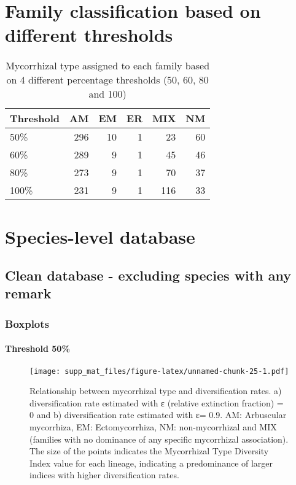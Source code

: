 \documentclass[]{article}
\let\oldparagraph\paragraph
\renewcommand{\paragraph}[1]{\oldparagraph{#1}\mbox{}}
\begin{document}
\hypertarget{family-classification-based-on-different-thresholds}{%
\section{Family classification based on different
thresholds}\label{family-classification-based-on-different-thresholds}}

\begin{longtable}{l|r|r|r|r|r}
\caption{\label{tab:unnamed-chunk-23}Mycorrhizal type assigned to each family based on 4 different percentage thresholds (50, 60, 80 and 100)}\\
\hline
Threshold & AM & EM & ER & MIX & NM\\
\hline
50\% & 296 & 10 & 1 & 23 & 60\\
\hline
60\% & 289 & 9 & 1 & 45 & 46\\
\hline
80\% & 273 & 9 & 1 & 70 & 37\\
\hline
100\% & 231 & 9 & 1 & 116 & 33\\
\hline
\end{longtable}

\hypertarget{species-level-database}{%
\section{Species-level database}\label{species-level-database}}

\hypertarget{clean-database---excluding-species-with-any-remark}{%
\subsection{Clean database - excluding species with any
remark}\label{clean-database---excluding-species-with-any-remark}}

\hypertarget{boxplots-2}{%
\subsubsection{Boxplots}\label{boxplots-2}}

\hypertarget{threshold-50-2}{%
\paragraph{Threshold 50\%}\label{threshold-50-2}}

\begin{figure}
\centering
\texttt{[image: supp\_mat\_files/figure-latex/unnamed-chunk-25-1.pdf]}
\caption{Relationship between mycorrhizal type and diversification
rates. a) diversification rate estimated with ε (relative extinction
fraction) = 0 and b) diversification rate estimated with ε= 0.9. AM:
Arbuscular mycorrhiza, EM: Ectomycorrhiza, NM: non-mycorrhizal and MIX
(families with no dominance of any specific mycorrhizal association).
The size of the points indicates the Mycorrhizal Type Diversity Index
value for each lineage, indicating a predominance of larger indices with
higher diversification rates.}
\end{figure}
\end{document}
